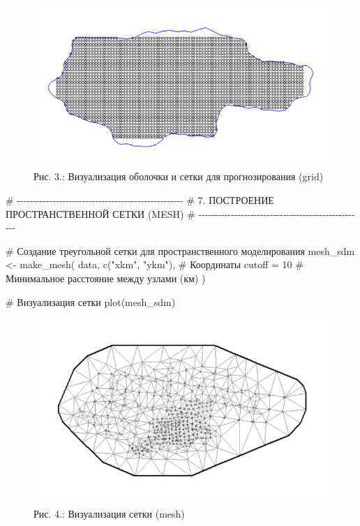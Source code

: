 \documentclass[
  letterpaper,
  DIV=11,
  numbers=noendperiod]{scrreprt}
\newenvironment{Shaded}{\begin{snugshade}}{\end{snugshade}}
\newcommand{\AttributeTok}[1]{\textcolor[rgb]{0.40,0.45,0.13}{#1}}
\newcommand{\CommentTok}[1]{\textcolor[rgb]{0.37,0.37,0.37}{#1}}
\newcommand{\DecValTok}[1]{\textcolor[rgb]{0.68,0.00,0.00}{#1}}
\newcommand{\FunctionTok}[1]{\textcolor[rgb]{0.28,0.35,0.67}{#1}}
\newcommand{\NormalTok}[1]{\textcolor[rgb]{0.00,0.23,0.31}{#1}}
\newcommand{\OtherTok}[1]{\textcolor[rgb]{0.00,0.23,0.31}{#1}}
\newcommand{\StringTok}[1]{\textcolor[rgb]{0.13,0.47,0.30}{#1}}
\begin{document}
\begin{figure}[H]

{\centering \includegraphics[width=0.6\linewidth,height=\textheight,keepaspectratio]{images/sdmTMB3.PNG}

}

\caption{Рис. 3.: Визуализация оболочки и сетки для прогнозирования
(grid)}

\end{figure}%

\begin{Shaded}
\begin{Highlighting}[]
\CommentTok{\# {-}{-}{-}{-}{-}{-}{-}{-}{-}{-}{-}{-}{-}{-}{-}{-}{-}{-}{-}{-}{-}{-}{-}{-}{-}{-}{-}{-}{-}{-}{-}{-}{-}{-}{-}{-}{-}{-}{-}{-}{-}{-}{-}{-}{-}{-}{-}{-}{-}{-}{-}}
\CommentTok{\# 7. ПОСТРОЕНИЕ ПРОСТРАНСТВЕННОЙ СЕТКИ (MESH)}
\CommentTok{\# {-}{-}{-}{-}{-}{-}{-}{-}{-}{-}{-}{-}{-}{-}{-}{-}{-}{-}{-}{-}{-}{-}{-}{-}{-}{-}{-}{-}{-}{-}{-}{-}{-}{-}{-}{-}{-}{-}{-}{-}{-}{-}{-}{-}{-}{-}{-}{-}{-}{-}{-}}

\CommentTok{\# Создание треугольной сетки для пространственного моделирования}
\NormalTok{mesh\_sdm }\OtherTok{\textless{}{-}} \FunctionTok{make\_mesh}\NormalTok{(}
\NormalTok{  data, }
  \FunctionTok{c}\NormalTok{(}\StringTok{"xkm"}\NormalTok{, }\StringTok{"ykm"}\NormalTok{),  }\CommentTok{\# Координаты}
  \AttributeTok{cutoff =} \DecValTok{10}        \CommentTok{\# Минимальное расстояние между узлами (км)}
\NormalTok{)}

\CommentTok{\# Визуализация сетки }
 \FunctionTok{plot}\NormalTok{(mesh\_sdm)}
\end{Highlighting}
\end{Shaded}

\begin{figure}[H]

{\centering \includegraphics[width=0.6\linewidth,height=\textheight,keepaspectratio]{images/sdmTMB4.PNG}

}

\caption{Рис. 4.: Визуализация сетки (mesh)}

\end{figure}%
\end{document}
